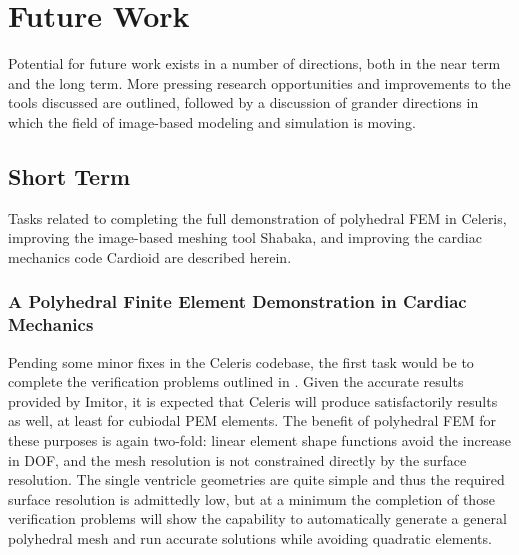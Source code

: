\chapter{Future Work}
\label{chap:6}

Potential for future work exists in a number of directions, both in the near term and the long term. More pressing research opportunities and improvements to the tools discussed are outlined, followed by a discussion of grander directions in which the field of image-based modeling and simulation is moving.

\section{Short Term}
\label{Short Term}

Tasks related to completing the full demonstration of polyhedral FEM in Celeris, improving the image-based meshing tool Shabaka, and improving the cardiac mechanics code Cardioid are described herein.

\subsection[A Polyhedral Finite Element Demonstration in Cardiac \\ Mechanics]{\texorpdfstring{A Polyhedral Finite Element Demonstration in Cardiac Mechanics}{A Polyhedral Finite Element Demonstration in Cardiac Mechanics}}
\label{A Polyhedral Finite Element Demonstration in Cardiac Mechanics}

Pending some minor fixes in the Celeris codebase, the first task would be to complete the verification problems outlined in . Given the accurate results provided by Imitor, it is expected that Celeris will produce satisfactorily results as well, at least for cubiodal PEM elements. The benefit of polyhedral FEM for these purposes is again two-fold: linear element shape functions avoid the increase in DOF, and the mesh resolution is not constrained directly by the surface resolution. The single ventricle geometries are quite simple and thus the required surface resolution is admittedly low, but at a minimum the completion of those verification problems will show the capability to automatically generate a general polyhedral mesh and run accurate solutions while avoiding quadratic elements.

